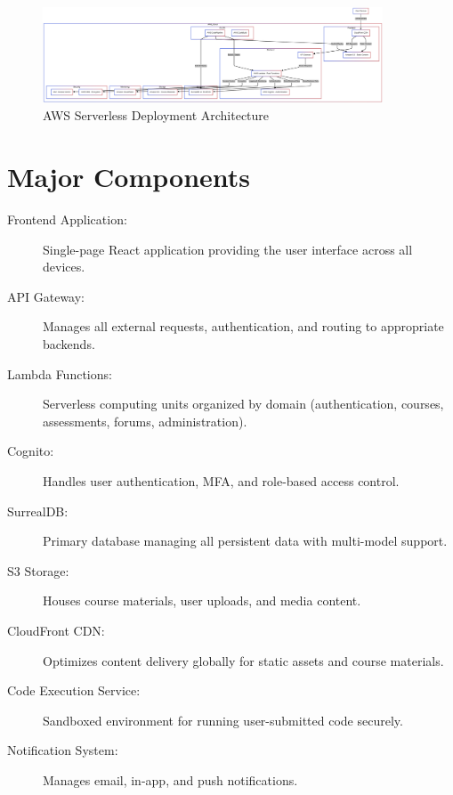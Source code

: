 \documentclass[a4paper, 11pt]{scrreprt}
\begin{document}
\begin{figure}[ht]
    \centering
    \includegraphics[width=0.9\textwidth]{serverless_deployment.png}
    \caption{AWS Serverless Deployment Architecture}
\end{figure}

\section{Major Components}

\begin{description}
    \item[Frontend Application:] Single-page React application providing the user interface across all devices.
    
    \item[API Gateway:] Manages all external requests, authentication, and routing to appropriate backends.
    
    \item[Lambda Functions:] Serverless computing units organized by domain (authentication, courses, assessments, forums, administration).
    
    \item[Cognito:] Handles user authentication, MFA, and role-based access control.
    
    \item[SurrealDB:] Primary database managing all persistent data with multi-model support.
    
    \item[S3 Storage:] Houses course materials, user uploads, and media content.
    
    \item[CloudFront CDN:] Optimizes content delivery globally for static assets and course materials.
    
    \item[Code Execution Service:] Sandboxed environment for running user-submitted code securely.
    
    \item[Notification System:] Manages email, in-app, and push notifications.
\end{description}
\end{document}
